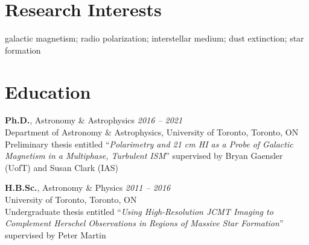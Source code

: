 \documentclass[10pt]{res} %
\begin{document}
\begin{resume}


\section{\Large Research Interests}
\vspace{-5pt} %
\noindent\makebox[\linewidth]{\rule{\textwidth}{0.4pt}}
\vspace{-20pt} %

galactic magnetism; radio polarization; interstellar medium; dust extinction; star formation


\section{\Large Education}
\vspace{-5pt} %
\noindent\makebox[\linewidth]{\rule{\textwidth}{0.4pt}}
\vspace{-20pt} %

{\bf Ph.D.}, Astronomy \& Astrophysics \hfill \textit{2016 -- 2021} \\
Department of Astronomy \& Astrophysics, University of Toronto, Toronto, ON \\
Preliminary thesis entitled ``\textit{Polarimetry and 21 cm HI as a Probe of Galactic Magnetism in a Multiphase, Turbulent ISM}'' supervised by Bryan Gaensler (UofT) and Susan Clark (IAS)

{\bf H.B.Sc.}, Astronomy \& Physics \hfill \textit{2011 -- 2016} \\ 
University of Toronto, Toronto, ON \\ 
Undergraduate thesis entitled ``\textit{Using High-Resolution JCMT Imaging to Complement Herschel Observations in Regions of Massive Star Formation}'' supervised by Peter Martin
 


\end{resume}
\end{document}
